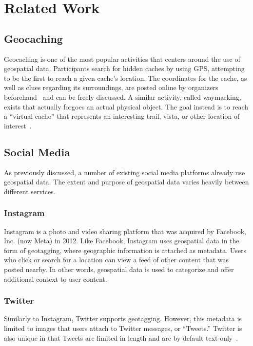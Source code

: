\section{Related Work}

\subsection{Geocaching}

Geocaching is one of the most popular activities that centers around the use of geospatial data. Participants search for hidden caches by using \textsc{GPS}, attempting to be the first to reach a given cache's location. The coordinates for the cache, as well as clues regarding its surroundings, are posted online by organizers beforehand~\cite{natgeo_2017} and can be freely discussed. A similar activity, called waymarking, exists that actually forgoes an actual physical object. The goal instead is to reach a \enquote{virtual cache} that represents an interesting trail, vista, or other location of interest~\cite{natgeo_2017}.

\subsection{Social Media}

As previously discussed, a number of existing social media platforms already use geospatial data. The extent and purpose of geospatial data varies heavily between different services.

\subsubsection{Instagram}

Instagram is a photo and video sharing platform that was acquired by Facebook, Inc. (now Meta) in 2012. Like Facebook, Instagram uses geospatial data in the form of geotagging, where geographic information is attached as metadata. Users who click or search for a location can view a feed of other content that was posted nearby. In other words, geospatial data is used to categorize and offer additional context to user content.

\subsubsection{Twitter}

Similarly to Instagram, Twitter supports geotagging. However, this metadata is limited to images that users attach to Twitter messages, or \enquote{Tweets.} Twitter is also unique in that Tweets are limited in length and are by default text-only~\cite{twitter_2022}.

